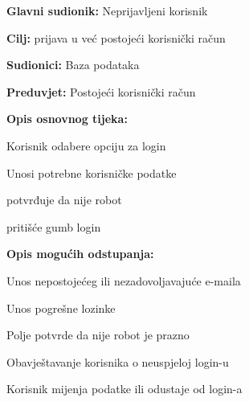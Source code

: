 					\noindent {}
					\begin{packed_item}
	
						\item \textbf{Glavni sudionik: }Neprijavljeni korisnik
						\item  \textbf{Cilj:} prijava u već postojeći korisnički račun
						\item  \textbf{Sudionici:} Baza podataka
						\item  \textbf{Preduvjet:} Postojeći korisnički račun
						\item  \textbf{Opis osnovnog tijeka:}
						
						\item[] \begin{packed_enum}
	
							\item Korisnik odabere opciju za login
							\item Unosi potrebne korisničke podatke
							\item potvrđuje da nije robot
							\item pritišće gumb login
						\end{packed_enum}
						
						\item  \textbf{Opis mogućih odstupanja:}
						
						\item[] \begin{packed_item}
	
							\item Unos nepostojećeg ili nezadovoljavajuće e-maila
							\item Unos pogrešne lozinke
							\item Polje potvrde da nije robot je prazno

							\item[] \begin{packed_enum}
								
								\item Obavještavanje korisnika o neuspjeloj login-u
								\item Korisnik mijenja podatke ili odustaje od login-a
								
							\end{packed_enum}
							
						\end{packed_item}
					\end{packed_item}

